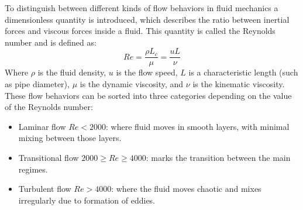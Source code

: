 To distinguish between different kinds of flow behaviors in fluid mechanics a dimensionless quantity is introduced, which describes the ratio between inertial forces and viscous forces inside a fluid.
This quantity is called the Reynolds number and is defined as:
$$
	Re = \frac{\rho L_c}{\mu} = \frac{u L}{\nu}
$$ 
Where $\rho$ is the fluid density, $u$ is the flow speed, $L$ is a characteristic length (such as pipe diameter), $\mu$ is the dynamic viscosity, and $\nu$ is the kinematic viscosity.
These flow behaviors can be sorted into three categories depending on the value of the Reynolds number:
\begin{itemize}
	\item Laminar flow $Re < 2000$: where fluid moves in smooth layers, with minimal mixing between those layers.
	\item Transitional flow $2000 \ge Re \ge 4000$: marks the transition between the main regimes.
	\item Turbulent flow $Re > 4000$: where the fluid moves chaotic and mixes irregularly due to formation of eddies.
\end{itemize}
